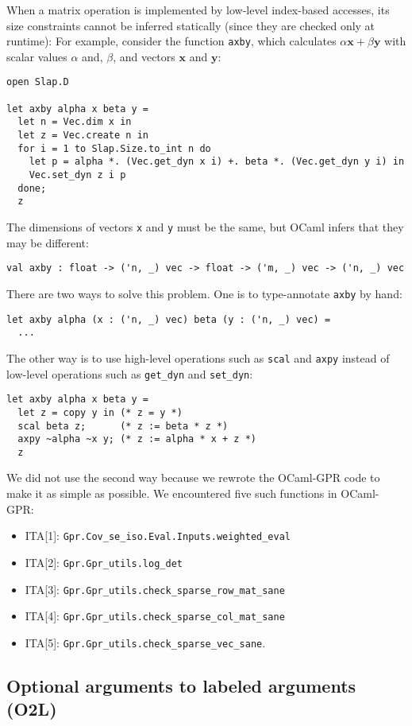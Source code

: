 \documentclass[10pt,a4paper]{article}
\begin{document}
When a matrix operation is implemented by low-level index-based accesses, its
size constraints cannot be inferred statically (since they are checked only at
runtime): For example, consider the function \lstinline|axby|, which calculates
$\alpha \bm{x} + \beta \bm{y}$ with scalar values $\alpha$ and, $\beta$, and
vectors $\bm{x}$ and $\bm{y}$:
\begin{lstlisting}
open Slap.D

let axby alpha x beta y =
  let n = Vec.dim x in
  let z = Vec.create n in
  for i = 1 to Slap.Size.to_int n do
    let p = alpha *. (Vec.get_dyn x i) +. beta *. (Vec.get_dyn y i) in
    Vec.set_dyn z i p
  done;
  z
\end{lstlisting}
The dimensions of vectors \lstinline|x| and \lstinline|y| must be the same, but OCaml infers that
they may be different:
\begin{lstlisting}
val axby : float -> ('n, _) vec -> float -> ('m, _) vec -> ('n, _) vec
\end{lstlisting}
There are two ways to solve this problem. One is to type-annotate
\lstinline|axby| by hand:
\begin{lstlisting}
let axby alpha (x : ('n, _) vec) beta (y : ('n, _) vec) =
  ...
\end{lstlisting}
The other way is to use high-level operations such as \lstinline|scal| and
\lstinline|axpy| instead of low-level operations such as \lstinline|get_dyn|
and \lstinline|set_dyn|:
\begin{lstlisting}
let axby alpha x beta y =
  let z = copy y in (* z = y *)
  scal beta z;      (* z := beta * z *)
  axpy ~alpha ~x y; (* z := alpha * x + z *)
  z
\end{lstlisting}
We did not use the second way because we rewrote the OCaml-GPR code to
make it as simple as possible. We encountered five such functions in OCaml-GPR:
\begin{itemize}
\item ITA[1]: \lstinline|Gpr.Cov_se_iso.Eval.Inputs.weighted_eval|
\item ITA[2]: \lstinline|Gpr.Gpr_utils.log_det|
\item ITA[3]: \lstinline|Gpr.Gpr_utils.check_sparse_row_mat_sane|
\item ITA[4]: \lstinline|Gpr.Gpr_utils.check_sparse_col_mat_sane|
\item ITA[5]: \lstinline|Gpr.Gpr_utils.check_sparse_vec_sane|.
\end{itemize}

\subsection{Optional arguments to labeled arguments (O2L)}
\label{sec:O2L}
\end{document}
